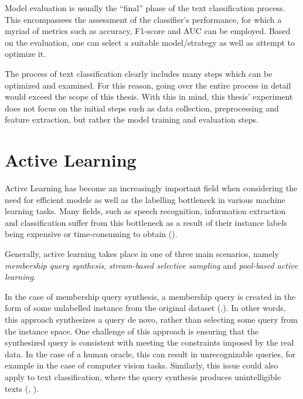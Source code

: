 \documentclass[english,bachelor,ul]{webisthesis} %
\begin{document}
Model evaluation is usually the ``final'' phase of the text classification process. This encompassees the assessment of the classifier's performance, for which a myriad of metrics such as accuracy, F1-score and AUC can be employed. Based on the evaluation, one can select a suitable model/strategy as well as attempt to optimize it.

The process of text classification clearly includes many steps which can be optimized and examined. For this reason, going over the entire process in detail would exceed the scope of this thesis. With this in mind, this thesis' experiment does not focus on the initial steps such as data collection, preprocessing and feature extraction, but rather the model training and evaluation steps.


\section{Active Learning}

Active Learning has become an increasingly important field when considering the need for efficient models as well as the labelling bottleneck in various machine learning tasks. Many fields, such as speech recognition, information extraction and classification suffer from this bottleneck as a result of their instance labels being expensive or time-consuming to obtain (\cite{settles.tr09}). 

Generally, active learning takes place in one of three main scenarios, namely \textit{membership query synthesis}, \textit{stream-based selective sampling} and \textit{pool-based active learning}. 

In the case of membership query synthesis, a membership query is created in the form of some unlabelled instance from the original dataset (\cite{DBLP:journals/ml/Angluin87},\cite{DBLP:journals/ijon/WangHYL15}). In other words, this approach synthesizes a query de novo, rather than selecting some query from the instance space. One challenge of this approach is ensuring that the synthesized query is consistent with meeting the constraints imposed by the real data. In the case of a human oracle, this can result in unrecognizable queries, for example in the case of computer vision tasks. Similarly, this issue could also apply to text classification, where the query synthesis produces unintelligible texts (\cite{langbaum92}, \cite{settles.tr09}).%
\end{document}
